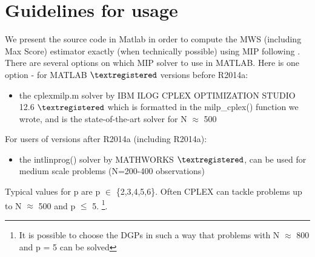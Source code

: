 \documentclass[12pt]{article}
\begin{document}
\section{Guidelines for usage} \label{Sec:Guidelines}

We present the source code in Matlab in order to compute the MWS (including Max Score) estimator exactly (when technically possible) using MIP following \cite{Florios08}.
There are several options on which MIP solver to use in MATLAB.
Here is one option - for MATLAB $\textregistered$ versions before R2014a:

\begin{itemize}

\item
the cplexmilp.m solver by IBM ILOG CPLEX OPTIMIZATION STUDIO 12.6 $\textregistered$  which is formatted in the milp\_cplex() function we wrote,
and is the state-of-the-art solver for N $\approx$ 500
\end{itemize}

For users of versions after R2014a (including R2014a):

\begin{itemize}
\item 
the intlinprog() solver by MATHWORKS $\textregistered$, can be used for medium scale problems (N=200-400 observations)
\end{itemize}

Typical values for p are p $\in$ \{2,3,4,5,6\}. Often CPLEX can tackle problems up to N  $\approx$ 500 and p $\leq$ 5.
\footnote{It is possible to choose the DGPs in such a way that problems with N $\approx$ 800 and p = 5 can be solved}.



\end{document}
